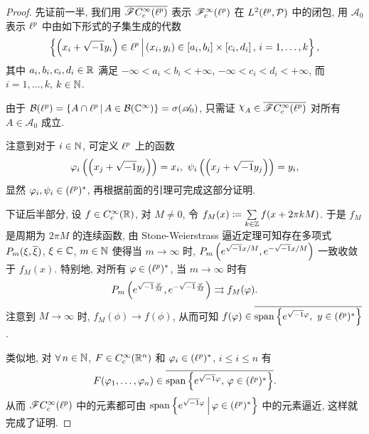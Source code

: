 \begin{proof}
先证前一半, 我们用 $\rmean{\mathscr{F}C_c^\infty(\lp)}$ 表示 $\mathscr{F}_c^\infty(\ell^p)$ 在 $L^2(\ell^p,\mathcal{P})$ 中的闭包, 用 $\mathscr{A}_0$ 表示 $\ell^p$ 中由如下形式的子集生成的代数
$$\left\{\left(x_i+\sqrt{\smash{-}1} y_i\right)\in\ell^p\,\middle\vert\,\left(x_i,y_i\right)\in\left[a_i,b_i\right]\times\left[c_i,d_i\right],\,i=1,\ldots,k\right\},$$
其中 $a_i,b_i,c_i,d_i\in\mathbb{R}$ 满足 $-\infty<a_i<b_i<+\infty$, $-\infty<c_i<d_i<+\infty$, 而 $i=1,\dots,k$, $k\in\mathbb{N}$.\par
由于 $\mathcal{B}(\ell^p)=\left\{A\cap\ell^p\,\middle\vert\,A\in\mathcal{B}(\mathbb{C}^\infty)\right\}=\sigma(\mathscr{A}_0)$, 只需证 $\rchi_A\in\rmean{\SF C_c^\infty(\lp)}$ 对所有 $A\in\mathscr{A}_0$ 成立.\par
注意到对于 $i\in\mathbb{N}$, 可定义 $\ell^p$ 上的函数
$$\phi_i\left(\left(x_j+\xs y_j\right)\right)=x_i,\ \psi_i\left(\left(x_j+\xs y_j\right)\right)=y_i,$$
显然 $\varphi_i,\psi_i\in(\ell^p)^*$, 再根据前面的引理可完成这部分证明.\par
下证后半部分, 设 $f\in C_c^\infty(\mathbb{R})$, 对 $M\neq0$, 令 $f_M(x)\coloneqq\sum\limits_{k\in\mathbb{Z}} f(x+2\pi kM)$. 于是 $f_M$ 是周期为 $2\pi M$ 的连续函数, 由 Stone-Weierstrass 逼近定理可知存在多项式 $P_m(\xi,\overline{\xi})$, $\xi\in\mathbb{C}$, $m\in\mathbb{N}$ 使得当 $m\to\infty$ 时, $P_m\left(e^{\sqrt{\smash{-}1} x/M},e^{-\sqrt{\smash{-}1} x/M}\right)$ 一致收敛于 $f_M(x)$. 特别地, 对所有 $\varphi\in(\ell^p)^*$, 当 $m\to\infty$ 时有 
$$P_m\left(e^{\sqrt{\smash{-}1}\frac{\varphi}{M}},e^{-\sqrt{\smash{-}1}\frac{\varphi}{M}}\right)\rightrightarrows f_M(\varphi).$$
注意到 $M\to\infty$ 时, $f_M(\phi)\to f(\phi)$, 从而可知 $f(\phi)\in\mean{\Span\left\{e^{\xs\phi},\ y\in(\lp)^*\right\}}$.\par
类似地, 对 $\forall n\in\nn$, $F\in C_c^\infty(\mathbb{R}^n)$ 和 $\varphi_i\in(\ell^p)^*$, $i\leq i\leq n$ 有
$$F(\varphi_1,\dots,\varphi_n)\in\overline{\mathrm{span}\left\{e^{\sqrt{\smash{-}1}\varphi},\,\varphi\in(\ell^p)^*\right\}}.$$
从而 $\mathscr{F}C_c^\infty(\ell^p)$ 中的元素都可由 $\mathrm{span}\left\{e^{\sqrt{\smash{-}1}\varphi}\,\middle\vert\,\varphi\in(\ell^p)^*\right\}$ 中的元素逼近, 这样就完成了证明.
\end{proof}
